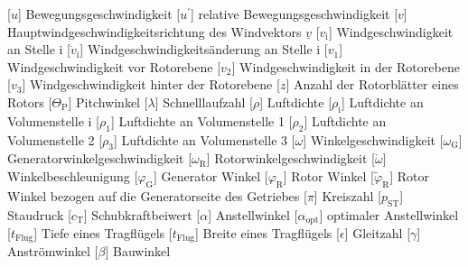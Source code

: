 \documentclass[
	pagesize,
	fontsize=12pt,
	paper=a4,
	oneside,
   reqno
]{scrartcl}
\numberwithin{equation}{section} %
\numberwithin{table}{section} %
\numberwithin{figure}{section} %
\begin{document}
\begin{acronym}[Symbols]
            [$u$]                       {Bewegungsgeschwindigkeit}
           [$u^{'}$]                   {relative Bewegungsgeschwindigkeit}
            [$v$]                       {Hauptwindgeschwindigkeitsrichtung des Windvektors $\underline v$}
           [$v_{\mathrm{i}}$]          {Windgeschwindigkeit an Stelle i}
        [$\dot{v}_{\mathrm{i}}$]    {Windgeschwindigkeitsänderung an Stelle i}
           [$v_{\mathrm{1}}$]          {Windgeschwindigkeit vor Rotorebene}
           [$v_{\mathrm{2}}$]          {Windgeschwindigkeit in der Rotorebene}
           [$v_{\mathrm{3}}$]          {Windgeschwindigkeit hinter der Rotorebene}
            [$z$]                       {Anzahl der Rotorblätter eines Rotors}
       [$\Theta_{\mathrm{P}}$]     {Pitchwinkel}
       [$\lambda$]                 {Schnelllaufzahl}
          [$\rho$]                    {Luftdichte}
         [$\rho_{\mathrm{i}}$]       {Luftdichte an Volumenstelle i}
         [$\rho_{\mathrm{1}}$]       {Luftdichte an Volumenstelle 1}
         [$\rho_{\mathrm{2}}$]       {Luftdichte an Volumenstelle 2}
         [$\rho_{\mathrm{3}}$]       {Luftdichte an Volumenstelle 3}
        [$\omega$]                  {Winkelgeschwindigkeit}
       [$\omega_{\mathrm{G}}$]     {Generatorwinkelgeschwindigkeit}
       [$\omega_{\mathrm{R}}$]     {Ro\-tor\-win\-kel\-ge\-schwin\-dig\-keit}
     [$\dot \omega$]             {Winkelbeschleunigung}
         [$\varphi_{\mathrm{G}}$]    {Generator Winkel}
         [$\varphi_{\mathrm{R}}$]    {Rotor Winkel}
    [$\tilde{\varphi}_{\mathrm{R}}$]    {Rotor Winkel bezogen auf die Generatorseite des Getriebes}
           [$\pi$]                     {Kreiszahl}
          [$p_{\mathrm{ST}}$]         {Staudruck}
           [$c_{\mathrm{T}}$]          {Schubkraftbeiwert}
        [$\alpha$]                  {Anstellwinkel}
     [$\alpha_{\mathrm{opt}}$]   {optimaler Anstellwinkel}
        [$t_{\mathrm{Flug}}$]       {Tiefe eines Tragflügels}
        [$t_{\mathrm{Flug}}$]       {Breite eines Tragflügels}
          [$\epsilon$]                {Gleitzahl}
        [$\gamma$]                  {Anströmwinkel}
         [$\beta$]                   {Bauwinkel}
    \end{acronym}
\clearpage
\end{document}

